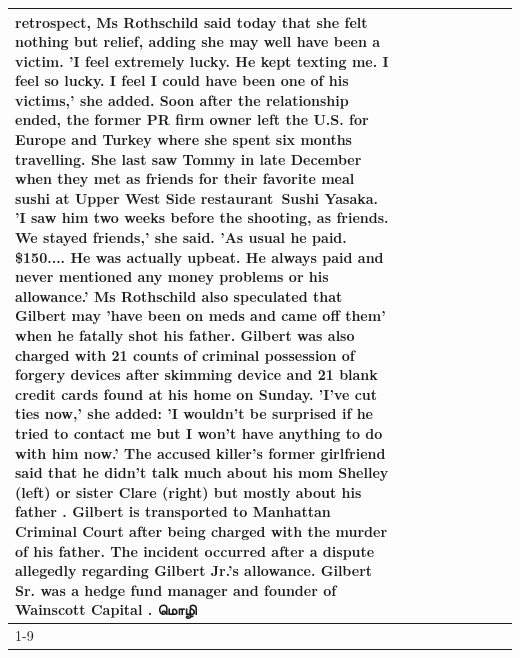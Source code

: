 \begin{table}[H]
\begin{tabular}{lllrlllll}
retrospect, Ms Rothschild said today that she felt nothing but relief, adding she may well have been a victim. 'I feel extremely lucky. He kept texting me. I feel so lucky. I feel I could have been one of his victims,' she added. Soon after the relationship ended, the former PR firm owner left the U.S. for Europe and Turkey where she spent six months  travelling. She last saw Tommy in late December when they met as friends for their favorite meal sushi at Upper West Side restaurant Sushi Yasaka. 'I saw him two weeks before the shooting, as friends. We stayed friends,' she said. 'As usual he paid. \$150.... He was actually upbeat. He always paid and never mentioned any money problems or his allowance.' Ms Rothschild also speculated that Gilbert may 'have been on meds and came off them' when he fatally shot his father. Gilbert was also charged with 21 counts of criminal possession of forgery devices after skimming device and 21 blank credit cards found at his home on Sunday. 'I've cut ties now,' she added: 'I wouldn’t be surprised if he tried to contact me but I won’t have anything to do with him now.' The accused killer's former girlfriend said that he didn't talk much about his mom Shelley (left) or sister Clare (right) but mostly about his father . Gilbert is transported to Manhattan Criminal Court  after being charged with the murder of his father. The incident occurred after a dispute allegedly regarding Gilbert Jr.'s allowance. Gilbert Sr. was a hedge fund manager and founder of Wainscott Capital . மொழி \\
\cline{1-9}

\end{tabular}
\end{table}
